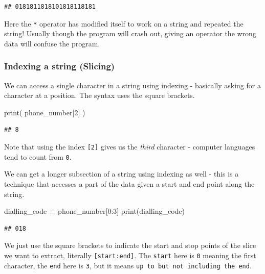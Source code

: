 \documentclass[]{book}
\newenvironment{Shaded}{\begin{snugshade}}{\end{snugshade}}
\newcommand{\BuiltInTok}[1]{#1}
\newcommand{\DecValTok}[1]{\textcolor[rgb]{0.00,0.00,0.81}{#1}}
\newcommand{\NormalTok}[1]{#1}
\newcommand{\OperatorTok}[1]{\textcolor[rgb]{0.81,0.36,0.00}{\textbf{#1}}}
\theoremstyle{definition}
\theoremstyle{definition}
\theoremstyle{definition}
\theoremstyle{remark}
\begin{document}
\begin{verbatim}
## 0181811818101818118181
\end{verbatim}

Here the \texttt{*} operator has modified itself to work on a string and
repeated the string! Usually though the program will crash out, giving
an operator the wrong data will confuse the program.

\hypertarget{indexing-a-string-slicing}{%
\subsubsection{Indexing a string
(Slicing)}\label{indexing-a-string-slicing}}

We can access a single character in a string using indexing - basically
asking for a character at a position. The syntax uses the square
brackets.

\begin{Shaded}
\begin{Highlighting}[]
\BuiltInTok{print}\NormalTok{( phone_number[}\DecValTok{2}\NormalTok{] )}
\end{Highlighting}
\end{Shaded}

\begin{verbatim}
## 8
\end{verbatim}

Note that using the index \texttt{{[}2{]}} gives us the \emph{third}
character - computer languages tend to count from \texttt{0}.

We can get a longer subsection of a string using indexing as well - this
is a technique that accesses a part of the data given a start and end
point along the string.

\begin{Shaded}
\begin{Highlighting}[]
\NormalTok{dialling_code }\OperatorTok{=}\NormalTok{ phone_number[}\DecValTok{0}\NormalTok{:}\DecValTok{3}\NormalTok{]}
\BuiltInTok{print}\NormalTok{(dialling_code)}
\end{Highlighting}
\end{Shaded}

\begin{verbatim}
## 018
\end{verbatim}

We just use the square brackets to indicate the start and stop points of
the slice we want to extract, literally \texttt{{[}start:end{]}}. The
\texttt{start} here is \texttt{0} meaning the first character, the
\texttt{end} here is \texttt{3}, but it means
\texttt{up\ to\ but\ not\ including\ the\ end}.
\end{document}
